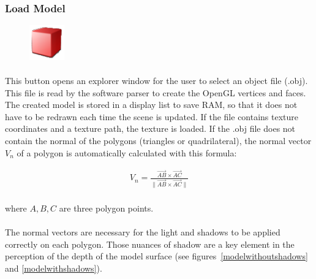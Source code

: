 \documentclass[12pt]{report}
\newcommand{\norm}[1]{\lVert#1\rVert}
\begin{document}
\subsubsection{Load Model}

\begin{figure}
\vspace{-20pt}
\includegraphics[width=1.5cm]{icons/load.png}
\end{figure}
\paragraph{}
	This button opens an explorer window for the user to select an object file (.obj). This file is read by the software parser to create the OpenGL vertices and faces. The created model is stored in a display list to save RAM, so that it does not have to be redrawn each time the scene is updated. If the file contains texture coordinates and a texture path, the texture is loaded. If the .obj file does not contain the normal of the polygons (triangles or quadrilateral), the normal vector $V_n$ of a polygon is automatically calculated with this formula:

	\begin{align}
	V_n = \frac{\vec{AB} \times \vec{AC}}{\norm{\vec{AB} \times \vec{AC}}}
	\end{align}

\paragraph{}
	where $A, B, C$ are three polygon points.

\paragraph{}
	The normal vectors are necessary for the light and shadows to be applied correctly on each polygon. Those nuances of shadow are a key element in the perception of the depth of the model surface (see figures~\ref{modelwithoutshadows} and \ref{modelwithshadows}).
\end{document}
